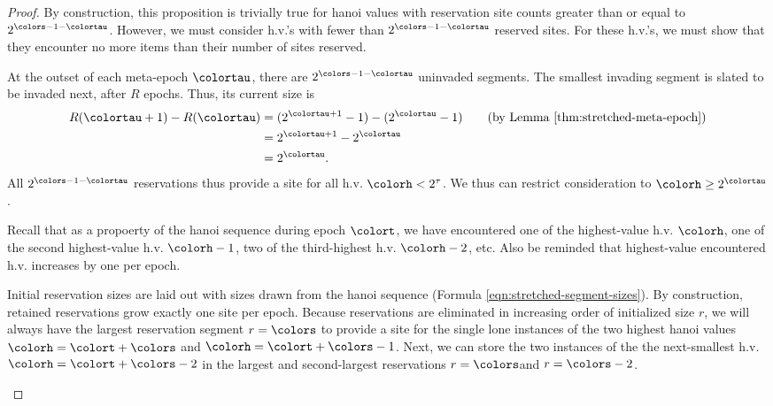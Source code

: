 \begin{proof}
By construction, this proposition is trivially true for hanoi values with reservation site counts greater than or equal to $2^{\colors-1-\colortau}$.
However, we must consider h.v.'s with fewer than $2^{\colors-1-\colortau}$ reserved sites.
For these h.v.'s, we must show that they encounter no more items than their number of sites reserved.

\begin{proofpart}

At the outset of each meta-epoch $\colortau$, there are $2^{\colors - 1 - \colortau}$ uninvaded segments.
The smallest invading segment is slated to be invaded next, after $R$ epochs.
Thus, its current size is
\begin{align*}
R(\colortau + 1) - R(\colortau)
&= (2^{\colortau + 1} - 1) - (2^{\colortau} - 1) \tag{by Lemma \ref{thm:stretched-meta-epoch}}\\
&= 2^{\colortau + 1} - 2^{\colortau}\\
&= 2^{\colortau}.
\end{align*}
All $2^{\colors - 1 - \colortau}$ reservations thus provide a site for all h.v. $\colorh < 2^{\tau}$.
We thus can restrict consideration to $\colorh \geq 2^{\colortau}$.
\end{proofpart}

\begin{proofpart}
Recall that as a propoerty of the hanoi sequence during epoch $\colort$, we have encountered one of the highest-value h.v. $\colorh$, one of the second highest-value h.v. $\colorh-1$, two of the third-highest h.v. $\colorh-2$, etc.
Also be reminded that highest-value encountered h.v. increases by one per epoch.

Initial reservation sizes are laid out with sizes drawn from the hanoi sequence (Formula \ref{eqn:stretched-segment-sizes}).
By construction, retained reservations grow exactly one site per epoch.
Because reservations are eliminated in increasing order of initialized size $r$, we will always have the largest reservation segment $r=\colors$ to provide a site for the single lone instances of the two highest hanoi values $\colorh=\colort+\colors$ and $\colorh=\colort+\colors-1$.
Next, we can store the two instances of the the next-smallest h.v. $\colorh=\colort+\colors-2$ in the largest and second-largest reservations $r=\colors$and $r=\colors-2$.


\end{proofpart}
\end{proof}
